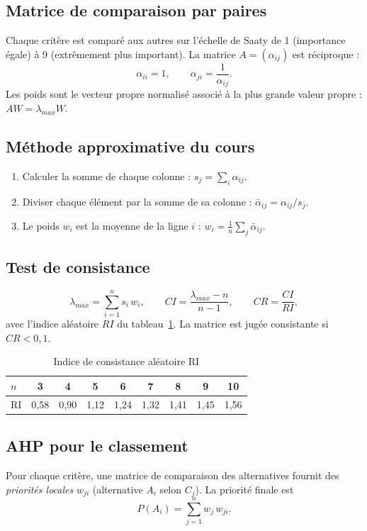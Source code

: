 \documentclass[11pt,a4paper]{report}
\theoremstyle{definition}
\theoremstyle{remark}
\begin{document}
\subsection{Matrice de comparaison par paires}
Chaque critère est comparé aux autres sur l'échelle de Saaty de 1 (importance égale) à 9 (extrêmement plus
important). La matrice $A=(\alpha_{ij})$ est réciproque :
\begin{equation}
  \alpha_{ii}=1,\qquad \alpha_{ji}=\frac{1}{\alpha_{ij}}.
\end{equation}
Les poids sont le vecteur propre normalisé associé à la plus grande valeur propre : $AW=\lambda_{max}W$.

\subsection{Méthode approximative du cours}
\begin{enumerate}
  \item Calculer la somme de chaque colonne : $s_j=\sum_i \alpha_{ij}$.
  \item Diviser chaque élément par la somme de sa colonne : $\bar\alpha_{ij}=\alpha_{ij}/s_j$.
  \item Le poids $w_i$ est la moyenne de la ligne $i$ : $w_i=\frac{1}{n}\sum_j \bar\alpha_{ij}$.
\end{enumerate}

\subsection{Test de consistance}
\begin{equation}
  \lambda_{max}=\sum_{i=1}^n s_i\,w_i,\qquad CI=\frac{\lambda_{max}-n}{n-1},\qquad CR=\frac{CI}{RI},
\end{equation}
avec l'indice aléatoire $RI$ du tableau~\ref{tab:ri}. La matrice est jugée consistante si $CR<0{,}1$.

\begin{table}[H]
\centering
\caption{Indice de consistance aléatoire RI}\label{tab:ri}
\begin{tabular}{l*{8}{c}}
\toprule
$n$ & 3 & 4 & 5 & 6 & 7 & 8 & 9 & 10\\
\midrule
RI & 0,58 & 0,90 & 1,12 & 1,24 & 1,32 & 1,41 & 1,45 & 1,56\\
\bottomrule
\end{tabular}
\end{table}

\subsection{AHP pour le classement}
Pour chaque critère, une matrice de comparaison des alternatives fournit des \emph{priorités locales}
$w_{ji}$ (alternative $A_i$ selon $C_j$). La priorité finale est
\begin{equation}
  P(A_i)=\sum_{j=1}^n w_j\, w_{ji}.
\end{equation}
\end{document}
